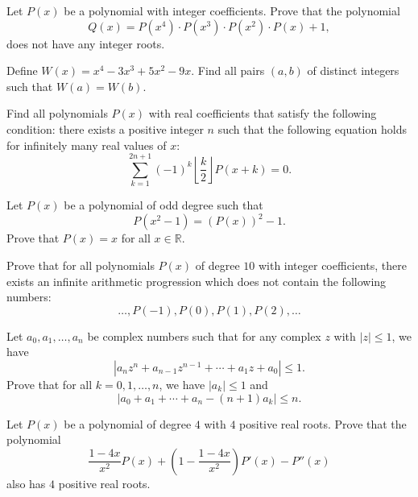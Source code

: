 \documentclass[12pt,a4paper]{memoir}
\theoremstyle{definition}
\begin{document}
\begin{question}[name={2000 Iran}]
	Let $P(x)$ be a polynomial with integer coefficients. Prove that the polynomial
	\[Q(x)=P(x^4)\cdot P(x^3) \cdot P(x^2) \cdot P(x) + 1,\]
	does not have any integer roots.
\end{question}


\begin{question}[name={2003 Poland}]
	Define $W(x)=x^4-3x^3+5x^2-9x$. Find all pairs $(a,b)$ of distinct integers such that $W(a)=W(b)$.
\end{question}


\begin{question}[name={2000 Austrian--Polish}]
	Find all polynomials $P(x)$ with real coefficients that satisfy the following condition: there exists a positive integer $n$ such that the following equation holds for infinitely many real values of $x$:
	\[\sum_{k=1}^{2n+1} (-1)^k \left\lfloor\frac{k}{2}\right\rfloor P(x+k) = 0.\] 
\end{question}



\begin{question}[name={2000 Poland}]
	Let $P(x)$ be a polynomial of odd degree such that
	\[P(x^2-1)=(P(x))^2 - 1.\]
	Prove that $P(x)=x$ for all $x\in\mathbb R$.
\end{question}


\begin{question}[name={1996 Russia}]
	Prove that for all polynomials $P(x)$ of degree $10$ with integer coefficients, there exists an infinite arithmetic progression which does not contain the following numbers:
	\[\dots, P(-1), P(0), P(1), P(2), \dots\]
\end{question}


\begin{question}[name={1997 Romania}]
	Let $a_0,a_1,\dots,a_n$ be complex numbers such that for any complex $z$ with $|z|\leq 1$, we have \[|a_nz^n + a_{n-1}z^{n-1} + \cdots + a_1z + a_0| \leq 1.\] Prove that for all $k=0,1,\dots,n$, we have $|a_k| \leq 1$ and \[|a_0+a_1+\cdots+a_n-(n+1)a_k| \leq n.\]
\end{question}


\begin{question}[name={1994 Vietnam}]
	Let $P(x)$ be a polynomial of degree $4$ with $4$ positive real roots. Prove that the polynomial
	\[\frac{1-4x}{x^2}P(x) + \left(1 - \frac{1-4x}{x^2}\right)P'(x) - P''(x)\]
	also has $4$ positive real roots.
\end{question}
\end{document}
